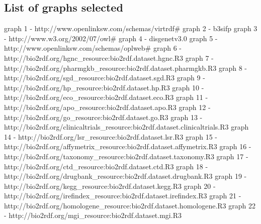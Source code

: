 \documentclass[a4paper,12pt]{article}
\begin{document}
\subsection{List of graphs selected}
graph 1 - http://www.openlinksw.com/schemas/virtrdf\# 
\newline
graph 2 - b3sifp 
\newline
graph 3 - http://www.w3.org/2002/07/owl\# 
\newline
graph 4 - disgenetv3.0 
\newline
graph 5 - http://www.openlinksw.com/schemas/oplweb\# 
\newline
graph 6 - http://bio2rdf.org/hgnc\_resource:bio2rdf.dataset.hgnc.R3 
\newline
graph 7 - http://bio2rdf.org/pharmgkb\_resource:bio2rdf.dataset.pharmgkb.R3 
\newline
graph 8 - http://bio2rdf.org/sgd\_resource:bio2rdf.dataset.sgd.R3 
\newline
graph 9 - http://bio2rdf.org/hp\_resource:bio2rdf.dataset.hp.R3 
\newline
graph 10 - http://bio2rdf.org/eco\_resource:bio2rdf.dataset.eco.R3 
\newline
graph 11 - http://bio2rdf.org/apo\_resource:bio2rdf.dataset.apo.R3 
\newline
graph 12 - http://bio2rdf.org/go\_resource:bio2rdf.dataset.go.R3 
\newline
graph 13 - http://bio2rdf.org/clinicaltrials\_resource:bio2rdf.dataset.clinicaltrials.R3 
\newline
graph 14 - http://bio2rdf.org/lsr\_resource:bio2rdf.dataset.lsr.R3 
\newline
graph 15 - http://bio2rdf.org/affymetrix\_resource:bio2rdf.dataset.affymetrix.R3 
\newline
graph 16 - http://bio2rdf.org/taxonomy\_resource:bio2rdf.dataset.taxonomy.R3 
\newline
graph 17 - http://bio2rdf.org/ctd\_resource:bio2rdf.dataset.ctd.R3 
\newline
graph 18 - http://bio2rdf.org/drugbank\_resource:bio2rdf.dataset.drugbank.R3 
\newline
graph 19 - http://bio2rdf.org/kegg\_resource:bio2rdf.dataset.kegg.R3 
\newline
graph 20 - http://bio2rdf.org/irefindex\_resource:bio2rdf.dataset.irefindex.R3 
\newline
graph 21 - http://bio2rdf.org/homologene\_resource:bio2rdf.dataset.homologene.R3 
\newline
graph 22 - http://bio2rdf.org/mgi\_resource:bio2rdf.dataset.mgi.R3 
\end{document}

